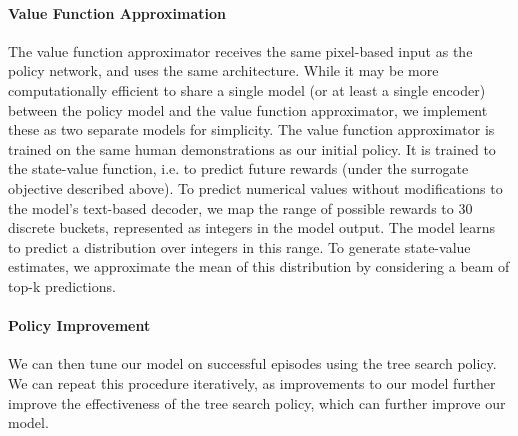 {\paragraph{Value Function Approximation} The value function approximator receives the same pixel-based input as the policy network, and uses the same architecture. While it may be more computationally efficient to share a single model (or at least a single encoder) between the policy model and the value function approximator, we implement these as two separate models for simplicity. The value function approximator is trained on the same human demonstrations as our initial policy. It is trained to the state-value function, i.e. to predict future rewards (under the surrogate objective described above). To predict numerical values without modifications to the model's text-based decoder, we map the range of possible rewards to 30 discrete buckets, represented as integers in the model output. The model learns to predict a distribution over integers in this range. To generate state-value estimates, we approximate the mean of this distribution by considering a beam of top-k predictions.

\paragraph{Policy Improvement} We can then tune our model on successful episodes using the tree search policy. We can repeat this procedure iteratively, as improvements to our model further improve the effectiveness of the tree search policy, which can further improve our model.}
